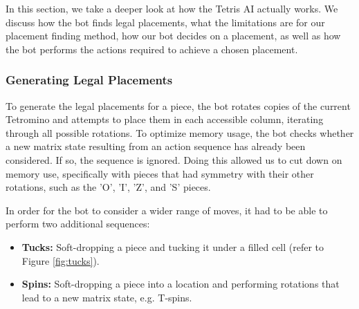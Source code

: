 \documentclass[a4paper, 12pt]{extreport}
\begin{document}
			In this section, we take a deeper look at how the Tetris AI actually works. We discuss how the bot finds legal placements, what the limitations are for our placement finding method, how our bot decides on a placement, as well as how the bot performs the actions required to achieve a chosen placement.  
		
			\subsubsection{Generating Legal Placements}
			
				To generate the legal placements for a piece, the bot rotates copies of the current Tetromino and attempts to place them in each accessible column, iterating through all possible rotations. To optimize memory usage, the bot checks whether a new matrix state resulting from an action sequence has already been considered. If so, the sequence is ignored. Doing this allowed us to cut down on memory use, specifically with pieces that had symmetry with their other rotations, such as the 'O', 'I', 'Z', and 'S' pieces.
				
				In order for the bot to consider a wider range of moves, it had to be able to perform two additional sequences:
				
				\begin{itemize}
					\item \textbf{Tucks:} Soft-dropping a piece and tucking it under a filled cell (refer to Figure \ref{fig:tucks}).
					\item \textbf{Spins:} Soft-dropping a piece into a location and performing rotations that lead to a new matrix state, e.g. T-spins.
				\end{itemize}
				
\end{document}
